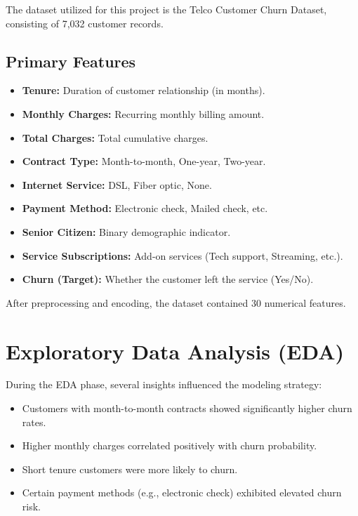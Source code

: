 \documentclass[12pt,a4paper]{article}
\begin{document}
The dataset utilized for this project is the Telco Customer Churn Dataset, consisting of 7,032 customer records.

\subsection*{Primary Features}

\begin{itemize}
    \item \textbf{Tenure:} Duration of customer relationship (in months).
    \item \textbf{Monthly Charges:} Recurring monthly billing amount.
    \item \textbf{Total Charges:} Total cumulative charges.
    \item \textbf{Contract Type:} Month-to-month, One-year, Two-year.
    \item \textbf{Internet Service:} DSL, Fiber optic, None.
    \item \textbf{Payment Method:} Electronic check, Mailed check, etc.
    \item \textbf{Senior Citizen:} Binary demographic indicator.
    \item \textbf{Service Subscriptions:} Add-on services (Tech support, Streaming, etc.).
    \item \textbf{Churn (Target):} Whether the customer left the service (Yes/No).
\end{itemize}

After preprocessing and encoding, the dataset contained 30 numerical features.


\section{Exploratory Data Analysis (EDA)}

During the EDA phase, several insights influenced the modeling strategy:

\begin{itemize}
    \item Customers with month-to-month contracts showed significantly higher churn rates.
    \item Higher monthly charges correlated positively with churn probability.
    \item Short tenure customers were more likely to churn.
    \item Certain payment methods (e.g., electronic check) exhibited elevated churn risk.
\end{itemize}
\end{document}
